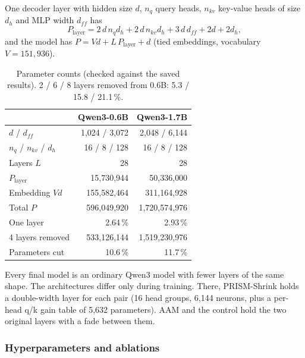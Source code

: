 \documentclass[11pt]{article}
\begin{document}
One decoder layer with hidden size $d$, $n_q$ query heads, $n_{kv}$ key-value heads of size $d_h$ and MLP width
$d_{ff}$ has
\begin{equation}
P_{\text{layer}} = 2\,d\,n_q d_h + 2\,d\,n_{kv} d_h + 3\,d\,d_{ff} + 2d + 2d_h ,
\end{equation}
and the model has $P = V d + L\,P_{\text{layer}} + d$ (tied embeddings, vocabulary $V=151{,}936$).

\begin{table}[t]
\centering\small
\begin{tabular}{lrr}
\toprule
 & Qwen3-0.6B & Qwen3-1.7B \\
\midrule
$d$ / $d_{ff}$ & 1{,}024 / 3{,}072 & 2{,}048 / 6{,}144 \\
$n_q$ / $n_{kv}$ / $d_h$ & 16 / 8 / 128 & 16 / 8 / 128 \\
Layers $L$ & 28 & 28 \\
$P_{\text{layer}}$ & 15{,}730{,}944 & 50{,}336{,}000 \\
Embedding $Vd$ & 155{,}582{,}464 & 311{,}164{,}928 \\
Total $P$ & 596{,}049{,}920 & 1{,}720{,}574{,}976 \\
One layer & 2.64\,\% & 2.93\,\% \\
\midrule
4 layers removed & 533{,}126{,}144 & 1{,}519{,}230{,}976 \\
Parameters cut & 10.6\,\% & 11.7\,\% \\
\bottomrule
\end{tabular}
\caption{Parameter counts (checked against the saved results). 2 / 6 / 8 layers removed from 0.6B: 5.3 / 15.8 /
21.1\,\%.}
\label{tab:params}
\end{table}

Every final model is an ordinary Qwen3 model with fewer layers of the same shape. The architectures differ only
during training. There, PRISM-Shrink holds a double-width layer for each pair (16 head groups, 6{,}144 neurons, plus
a per-head q/k gain table of 5{,}632 parameters). AAM and the control hold the two original layers with a fade
between them.

\subsubsection{Hyperparameters and ablations}
\end{document}
